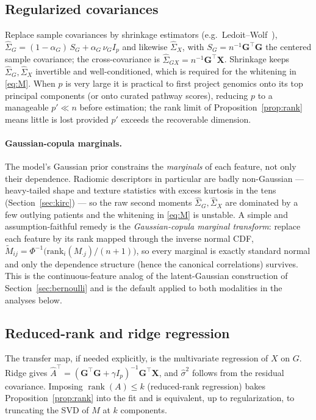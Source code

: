 \documentclass{article}
\newcommand{\rank}{\operatorname{rank}}
\newcommand{\Sg}{\Sigma_{G}}
\newcommand{\Sx}{\Sigma_{X}}
\newcommand{\Sgx}{\Sigma_{GX}}
\newcommand{\T}{^{\top}}
\begin{document}
\subsection{Regularized covariances}
\label{sec:estimation-cov}
Replace sample covariances by shrinkage estimators (e.g.\ Ledoit--Wolf~\citep{ledoit2004shrinkage}),
$\hat\Sg = (1-\alpha_G)\,S_G + \alpha_G\, \nu_G I_p$ and likewise $\hat\Sx$, with
$S_G = n^{-1}\mathbf{G}\T\mathbf{G}$ the centered sample covariance; the
cross-covariance is $\hat\Sgx = n^{-1}\mathbf{G}\T\mathbf{X}$. Shrinkage keeps
$\hat\Sg, \hat\Sx$ invertible and well-conditioned, which is required for the
whitening in \eqref{eq:M}. When $p$ is very large it is practical to first
project genomics onto its top principal components (or onto curated pathway
scores), reducing $p$ to a manageable $p' \ll n$ before estimation; the rank
limit of Proposition~\ref{prop:rank} means little is lost provided $p'$ exceeds
the recoverable dimension.

\paragraph{Gaussian-copula marginals.}
The model's Gaussian prior constrains the \emph{marginals} of each feature, not
only their dependence. Radiomic descriptors in particular are badly
non-Gaussian --- heavy-tailed shape and texture statistics with excess kurtosis
in the tens (Section~\ref{sec:kirc}) --- so the raw second moments
$\hat\Sg,\hat\Sx$ are dominated by a few outlying patients and the whitening in
\eqref{eq:M} is unstable. A simple and assumption-faithful remedy is the
\emph{Gaussian-copula marginal transform}: replace each feature by its
rank mapped through the inverse normal CDF,
$\tilde M_{ij} = \Phi^{-1}\!\big(\mathrm{rank}_i(M_{\cdot j})/(n+1)\big)$, so
every marginal is exactly standard normal and only the dependence structure
(hence the canonical correlations) survives. This is the continuous-feature
analog of the latent-Gaussian construction of Section~\ref{sec:bernoulli}
and is the default applied to both modalities in the analyses below.

\subsection{Reduced-rank and ridge regression}
\label{sec:estimation-rrr}
The transfer map, if needed explicitly, is the multivariate regression of $X$ on
$G$. Ridge gives
$\hat A\T = (\mathbf{G}\T\mathbf{G} + \gamma I_p)^{-1}\mathbf{G}\T\mathbf{X}$,
and $\hat\sigma^2$ follows from the residual covariance. Imposing
$\rank(A) \le k$ (reduced-rank regression) bakes Proposition~\ref{prop:rank}
into the fit and is equivalent, up to regularization, to truncating the SVD of
$M$ at $k$ components.
\end{document}
